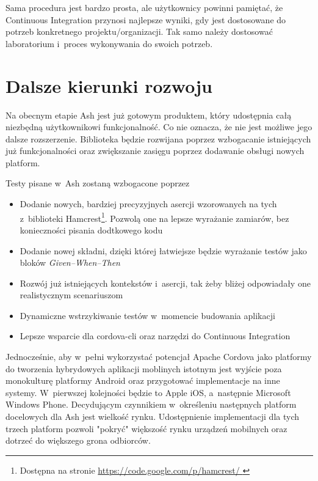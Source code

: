 \documentclass[brudnopis]{xmgr}
\begin{document}
Sama procedura jest bardzo prosta, ale użytkownicy powinni pamiętać, że Continuous Integration przynosi najlepsze wyniki, gdy jest dostosowane do potrzeb konkretnego projektu/organizacji. Tak samo należy dostosować laboratorium i~proces wykonywania do swoich potrzeb. 

\chapter{Dalsze kierunki rozwoju}

Na obecnym etapie Ash jest już gotowym produktem, który udostępnia całą niezbędną użytkownikowi funkcjonalność. Co nie oznacza, że nie jest możliwe jego dalsze rozszerzenie. Biblioteka będzie rozwijana poprzez wzbogacanie istniejących już funkcjonalności oraz zwiększanie zasięgu poprzez dodawanie obsługi nowych platform. 

Testy pisane w~Ash zostaną wzbogacone poprzez

\begin{itemize}
  \item Dodanie nowych, bardziej precyzyjnych asercji wzorowanych na tych z~biblioteki Hamcrest\footnote{Dostępna na stronie \url{https://code.google.com/p/hamcrest/ } }. Pozwolą one na lepsze wyrażanie zamiarów, bez konieczności pisania dodtkowego kodu
  \item Dodanie nowej składni, dzięki której łatwiejsze będzie wyrażanie testów jako bloków \textit{Given--When--Then}
  \item Rozwój już istniejących kontekstów i~asercji, tak żeby bliżej odpowiadały one realistycznym scenariuszom 
  \item Dynamiczne wstrzykiwanie testów w~momencie budowania aplikacji
  \item Lepsze wsparcie dla cordova-cli oraz narzędzi do Continuous Integration
\end{itemize}

Jednocześnie, aby w~pełni wykorzystać potencjał Apache Cordova jako platformy do tworzenia hybrydowych aplikacji moblinych istotnym jest wyjście poza monokulturę platformy Android oraz przygotować implementacje na inne systemy. W~pierwszej kolejności będzie to Apple iOS, a~następnie Microsoft Windows Phone. Decydującym czynnikiem w~określeniu następnych platform docelowych dla Ash jest wielkość rynku. Udostępnienie implementacji dla tych trzech platform pozwoli "pokryć" większość rynku urządzeń mobilnych oraz dotrzeć do większego grona odbiorców. 

\summary
\end{document}
